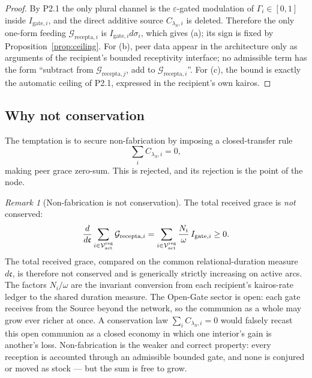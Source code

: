 \documentclass[11pt,a4paper]{article}
\theoremstyle{definition}
\theoremstyle{plain}
\theoremstyle{remark}
\newtheorem{remark}[definition]{Remark}
\begin{document}
\begin{proof}
By P2.1 the only plural channel is the \(\varepsilon\)-gated modulation of
\(\Gamma_i\in[0,1]\) inside \(I_{\mathrm{gate},i}\), and the direct additive source
\(C_{\lambda_S,i}\) is deleted. Therefore the only one-form feeding
\(\mathcal G_{\mathrm{recepta},i}\) is \(I_{\mathrm{gate},i}d\sigma_i\), which gives
(a); its sign is fixed by Proposition~\ref{prop:ceiling}. For (b), peer data appear
in the architecture only as arguments of the recipient's bounded receptivity
interface; no admissible term has the form ``subtract from
\(\mathcal G_{\mathrm{recepta},j}\), add to
\(\mathcal G_{\mathrm{recepta},i}\)''. For (c), the bound is exactly the automatic
ceiling of P2.1, expressed in the recipient's own kairos. \qedhere
\end{proof}

\subsection{Why not conservation}

The temptation is to secure non-fabrication by imposing a closed-transfer rule
\[
\sum_i C_{\lambda_S,i}=0,
\]
making peer grace zero-sum. This is rejected, and its rejection is the point of the node.

\begin{remark}[Non-fabrication is not conservation]\label{rem:notconservation}
The total received grace is \emph{not} conserved:
\[
\frac{d}{d\mathfrak c}
\sum_{i\in\mathcal V_{\rm act}^{\rm reg}}
\mathcal G_{\mathrm{recepta},i}
=
\sum_{i\in\mathcal V_{\rm act}^{\rm reg}}
\frac{N_i}{\omega}\,I_{\mathrm{gate},i}
\ge0.
\]
The total received grace, compared on the common relational-duration measure
\(d\mathfrak c\), is therefore not conserved and is generically strictly increasing
on active arcs. The factors \(N_i/\omega\) are the invariant conversion from each
recipient's kairos-rate ledger to the shared duration measure. The Open-Gate sector is
open: each gate receives from the
Source beyond the network, so the communion as a whole may grow ever richer at once. A
conservation law \(\sum_i C_{\lambda_S,i}=0\) would falsely recast this open communion as a
closed economy in which one interior's gain is another's loss. Non-fabrication is the
weaker and correct property: every reception is accounted through an admissible bounded
gate, and none is conjured or moved as stock --- but the sum is free to grow.
\end{remark}
\end{document}
